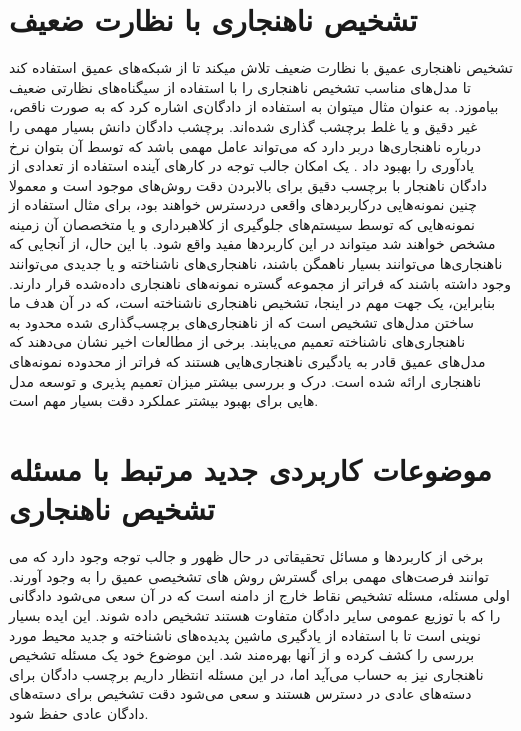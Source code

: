 \documentclass[12pt,a4paper]{report}
\begin{document}
\section{تشخیص ناهنجاری با نظارت ضعیف}
تشخیص ناهنجاری عمیق با نظارت ضعیف\cite{tian2021weakly, https://doi.org/10.48550/arxiv.1910.13601} تلاش میکند تا از شبکه‌های عمیق استفاده کند تا مدل‌های مناسب تشخیص ناهنجاری را با استفاده از سیگناه‌های نظارتی ضعیف بیاموزد. به عنوان مثال میتوان به استفاده از دادگان‌ی اشاره کرد که به صورت ناقص، غیر دقیق و یا غلط برچشب گذاری شده‌اند. برچشب دادگان دانش بسیار مهمی را درباره ناهنجاری‌ها دربر دارد که می‌تواند عامل مهمی باشد که توسط آن بتوان نرخ‌ یادآوری را بهبود داد \cite{0e1339c0e4924d93b1695af2f9e3e03c, https://doi.org/10.48550/arxiv.1910.13601, tian2021weakly, Sultani_2018_CVPR}. یک امکان جالب توجه در کار‌های آینده استفاده از تعدادی از دادگان ناهنجار با برچسب دقیق برای بالابردن دقت روش‌های موجود است و معمولا چنین نمونه‌هایی درکاربرد‌های واقعی دردسترس خواهند بود، برای مثال استفاده از نمونه‌هایی که توسط سیستم‌های جلوگیری از کلاهبرداری و یا متخصصان آن زمینه مشخص خواهند شد میتواند در این کاربرد‌ها مفید واقع شود. با این حال، از آنجایی که ناهنجاری‌ها می‌توانند بسیار ناهمگن باشند، ناهنجاری‌های ناشناخته و یا جدیدی می‌توانند وجود داشته باشند که فراتر از مجموعه گستره نمونه‌های ناهنجاری داده‌شده قرار دارند. بنابراین، یک جهت مهم در اینجا، تشخیص ناهنجاری ناشناخته است، که در آن هدف ما ساختن مدل‌های تشخیص است که از ناهنجاری‌های برچسب‌گذاری شده محدود به ناهنجاری‌های ناشناخته تعمیم می‌یابند. برخی از مطالعات اخیر\cite{Pang_2021, https://doi.org/10.48550/arxiv.1910.13601, pang2019deep, https://doi.org/10.48550/arxiv.1906.02694} نشان می‌دهند که مدل‌های عمیق قادر به یادگیری ناهنجاری‌هایی هستند که فراتر از محدوده نمونه‌های ناهنجاری ارائه شده است. درک و بررسی بیشتر میزان تعمیم پذیری و توسعه مدل هایی برای بهبود بیشتر عملکرد دقت بسیار مهم است. \\

\section{موضوعات کاربردی جدید مرتبط با مسئله تشخیص ناهنجاری}
برخی از کاربرد‌ها و مسائل تحقیقاتی در حال ظهور و جالب توجه وجود دارد که می توانند فرصت‌های مهمی برای گسترش روش های تشخیصی عمیق  را به وجود آورند. اولی مسئله، مسئله تشخیص نقاط خارج از دامنه است که در آن سعی می‌شود دادگانی را که با توزیع عمومی سایر دادگان متفاوت هستند تشخیص داده شوند\cite{https://doi.org/10.48550/arxiv.1610.02136, NEURIPS2018_abdeb6f5, https://doi.org/10.48550/arxiv.1906.02845}. این ایده بسیار نوینی است تا با استفاده از یادگیری ماشین پدیده‌های ناشناخته و جدید محیط مورد بررسی را کشف کرده و از آنها بهره‌مند شد. این موضوع خود یک مسئله تشخیص ناهنجاری نیز به حساب می‌آید اما، در این مسئله انتظار داریم برچسب دادگان برای دسته‌های عادی در دسترس هستند و سعی می‌شود دقت تشخیص برای دسته‌های دادگان عادی حفظ شود. \\
\end{document}
